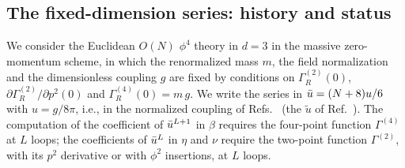 \subsection{The fixed-dimension series: history and status}
\label{sec:intro-fixed}

We consider the Euclidean $O(N)$ $\phi^4$ theory in $d=3$ in the massive zero-momentum scheme, in which the
renormalized mass $m$, the field normalization and the dimensionless coupling $g$ are fixed by conditions on
$\Gamma^{(2)}_R(0)$, $\partial\Gamma^{(2)}_R/\partial p^2(0)$ and $\Gamma^{(4)}_R(0)=m\,g$. We write the series in
$\bar u=(N+8)u/6$ with $u=g/8\pi$, i.e., in the normalized coupling of
Refs.~\cite{BNGM1976,BNM1978,Phi4tools2024} (the $\tilde u$ of Ref.~\cite{Phi4tools2024}). The computation of the
coefficient of $\bar u^{L+1}$ in $\beta$ requires the four-point function $\Gamma^{(4)}$ at $L$ loops; the coefficients of $\bar u^{L}$
in $\eta$ and $\nu$ require the two-point function $\Gamma^{(2)}$, with its $p^2$ derivative or with $\phi^2$
insertions, at $L$ loops.

